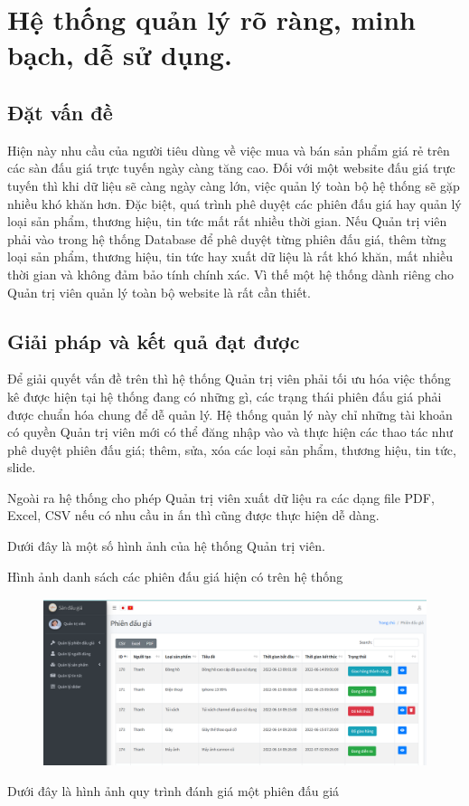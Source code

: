 \documentclass[../DoAn.tex]{subfiles}
\begin{document}
\section{Hệ thống quản lý rõ ràng, minh bạch, dễ sử dụng.}
\subsection{Đặt vấn đề}
Hiện này nhu cầu của người tiêu dùng về việc mua và bán sản phẩm giá rẻ trên các sàn đấu giá trực tuyến ngày càng tăng cao. Đối với một website đấu giá trực tuyến thì khi dữ liệu sẽ càng ngày càng lớn, việc quản lý toàn bộ hệ thống sẽ gặp nhiều khó khăn hơn. Đặc biệt, quá trình phê duyệt các phiên đấu giá hay quản lý loại sản phẩm, thương hiệu, tin tức mất rất nhiều thời gian. Nếu Quản trị viên phải vào trong hệ thống Database để phê duyệt từng phiên đấu giá, thêm từng loại sản phẩm, thương hiệu, tin tức hay xuất dữ liệu là rất khó khăn, mất nhiều thời gian và không đảm bảo tính chính xác. Vì thế một hệ thống dành riêng cho Quản trị viên quản lý toàn bộ website là rất cần thiết. 
\subsection{Giải pháp và kết quả đạt được}
Để giải quyết vấn đề trên thì hệ thống Quản trị viên phải tối ưu hóa việc thống kê được hiện tại hệ thống đang có những gì, các trạng thái phiên đấu giá phải được chuẩn hóa chung để dễ quản lý. Hệ thống quản lý này chỉ những tài khoản có quyền Quản trị viên mới có thể đăng nhập vào và thực hiện các thao tác như phê duyệt phiên đấu giá; thêm, sửa, xóa các loại sản phẩm, thương hiệu, tin tức, slide.

Ngoài ra hệ thống cho phép Quản trị viên xuất dữ liệu ra các dạng file PDF, Excel, CSV nếu có nhu cầu in ấn thì cũng được thực hiện dễ dàng. 

Dưới đây là một số hình ảnh của hệ thống Quản trị viên.

Hình ảnh danh sách các phiên đấu giá hiện có trên hệ thống
\begin{figure}[H]
    \centering
    \includegraphics[width=0.75\linewidth,height=4.91cm]{Hinhve/adminmanager.png}
\end{figure}
Dưới đây là hình ảnh quy trình đánh giá một phiên đấu giá
\end{document}
